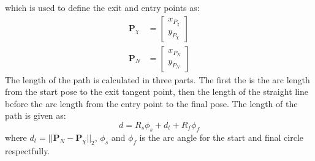 which is used to define the exit and entry points as:
\begin{subequations}
\begin{align}
\mathbf{P}_{\chi} &= \begin{bmatrix}
x_{P_\chi} \\
y_{P_\chi}
\end{bmatrix} \\
\mathbf{P}_N &= \begin{bmatrix}
x_{P_N} \\
y_{P_N}
\end{bmatrix}
\end{align}
\end{subequations}
The length of the path is calculated in three parts. The first the is the arc length from the start pose to the exit tangent point, then the length of the straight line before the arc length from the entry point to the final pose. The length of the path is given as: 
\begin{equation}
d = R_s\phi_s + d_t + R_f\phi_f
\end{equation}
where $d_t = ||\mathbf{P}_N-\mathbf{P}_{\chi}||_2$, $\phi_s$ and $\phi_f$ is the arc angle for the start and final circle respectfully.
\cleardoublepage